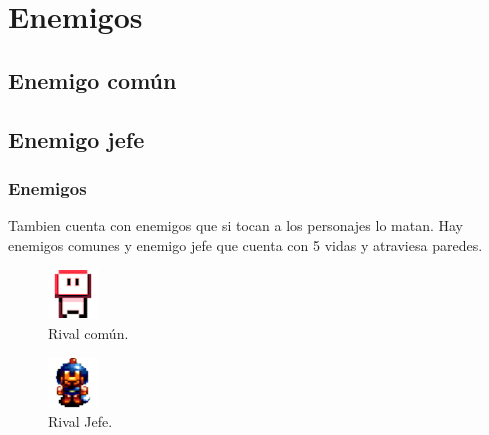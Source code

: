 \documentclass{beamer}
\begin{document}




\section{Enemigos}
\subsection{Enemigo común}
\subsection{Enemigo jefe}
\begin{frame}
\frametitle{Enemigos}

Tambien cuenta con enemigos que si tocan a los personajes lo matan. Hay enemigos comunes y enemigo jefe que cuenta con 5 vidas y atraviesa paredes.

\begin{figure}[H]
	\centering
	\includegraphics[scale=0.3]{assets/rivales/rivalfrente.png}
    \caption{Rival común.}
    \label{fig:rivalComun}
\end{figure}  
\begin{figure}[H]
	\centering
	\includegraphics[scale=0.3]{assets/rivales/bossfrente.png}
    \caption{Rival Jefe.}
    \label{fig:rivalJefe}
\end{figure} 

\end{frame}
\end{document}
